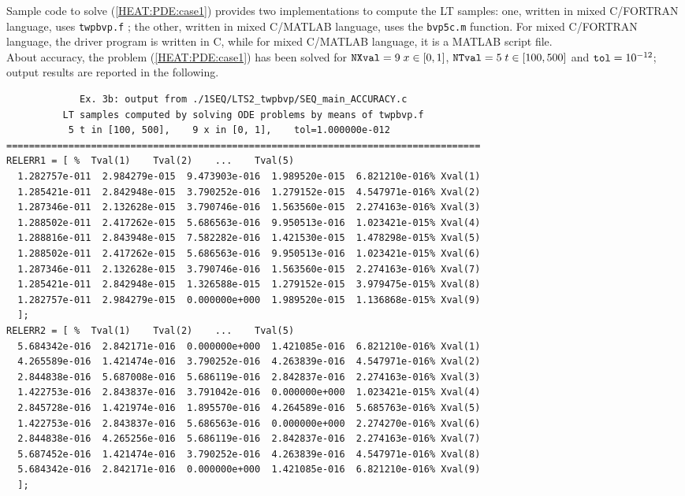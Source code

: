 \documentclass[a4paper,10pt]{report}%
\begin{document}
Sample code to solve (\ref{HEAT:PDE:case1}) provides two implementations to compute the LT samples: one,
written in mixed C/FORTRAN language, uses {\tt twpbvp.f} \cite{TWPBVP.f,TWPBVP:1990,TWPBVP:1991,ALG:927:2013};
the other, written in mixed C/MATLAB language, uses the {\tt bvp5c.m} function. For mixed C/FORTRAN language,
the driver program is written in C, while for mixed C/MATLAB language, it is a MATLAB script file.
\\
About accuracy, the problem (\ref{HEAT:PDE:case1}) has been solved for ${\tt NXval}=9\; x\in[0,1]$,
${\tt NTval}=5\; t\in[100,500]$ and ${\tt tol}=10^{-12}$; output results are reported in the following.
\begin{lstlisting}
             Ex. 3b: output from ./1SEQ/LTS2_twpbvp/SEQ_main_ACCURACY.c
          LT samples computed by solving ODE problems by means of twpbvp.f
           5 t in [100, 500],    9 x in [0, 1],    tol=1.000000e-012
====================================================================================
RELERR1 = [ %  Tval(1)    Tval(2)    ...    Tval(5)
  1.282757e-011  2.984279e-015  9.473903e-016  1.989520e-015  6.821210e-016% Xval(1)
  1.285421e-011  2.842948e-015  3.790252e-016  1.279152e-015  4.547971e-016% Xval(2)
  1.287346e-011  2.132628e-015  3.790746e-016  1.563560e-015  2.274163e-016% Xval(3)
  1.288502e-011  2.417262e-015  5.686563e-016  9.950513e-016  1.023421e-015% Xval(4)
  1.288816e-011  2.843948e-015  7.582282e-016  1.421530e-015  1.478298e-015% Xval(5)
  1.288502e-011  2.417262e-015  5.686563e-016  9.950513e-016  1.023421e-015% Xval(6)
  1.287346e-011  2.132628e-015  3.790746e-016  1.563560e-015  2.274163e-016% Xval(7)
  1.285421e-011  2.842948e-015  1.326588e-015  1.279152e-015  3.979475e-015% Xval(8)
  1.282757e-011  2.984279e-015  0.000000e+000  1.989520e-015  1.136868e-015% Xval(9)
  ];
RELERR2 = [ %  Tval(1)    Tval(2)    ...    Tval(5)
  5.684342e-016  2.842171e-016  0.000000e+000  1.421085e-016  6.821210e-016% Xval(1)
  4.265589e-016  1.421474e-016  3.790252e-016  4.263839e-016  4.547971e-016% Xval(2)
  2.844838e-016  5.687008e-016  5.686119e-016  2.842837e-016  2.274163e-016% Xval(3)
  1.422753e-016  2.843837e-016  3.791042e-016  0.000000e+000  1.023421e-015% Xval(4)
  2.845728e-016  1.421974e-016  1.895570e-016  4.264589e-016  5.685763e-016% Xval(5)
  1.422753e-016  2.843837e-016  5.686563e-016  0.000000e+000  2.274270e-016% Xval(6)
  2.844838e-016  4.265256e-016  5.686119e-016  2.842837e-016  2.274163e-016% Xval(7)
  5.687452e-016  1.421474e-016  3.790252e-016  4.263839e-016  4.547971e-016% Xval(8)
  5.684342e-016  2.842171e-016  0.000000e+000  1.421085e-016  6.821210e-016% Xval(9)
  ];
\end{lstlisting}
\end{document}
